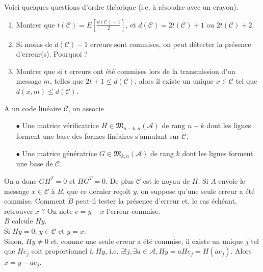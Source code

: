 Voici quelques questions d'ordre théorique (i.e. à résoudre avec un crayon).
\begin{enumerate}
\item Montrer que $t(\mathcal C)=E[\frac{d(\mathcal C)-1}{2}]$, et $d(\mathcal C)=2t(\mathcal C)+1$ ou $2t(\mathcal C)+2$.
\item Si moins de $d(\mathcal C)-1$ erreurs sont commises, on peut détecter la présence d'erreur(s). Pourquoi ?
\item Montrer que si $t$ erreurs ont été commises lors de la transmission d'un message $m$, telles que $2t+1\leq d(\mathcal C)$, alors il existe un unique $x\in \mathcal C$ tel que $d(x,m)\leq d(\mathcal C)$.\\
\end{enumerate}

A un code linéaire $\mathcal C$, on associe
\begin{itemize}
\item[$\bullet$] Une matrice vérificatrice $H\in \mathfrak M_{n-k,n}(\mathcal A)$ de rang $n-k$ dont les lignes forment une base des formes linéaires s'annulant sur $\mathcal C$.
\item[$\bullet$] Une matrice génératrice $G\in \mathfrak M_{k,n}(\mathcal A)$ de rang $k$ dont les lignes forment une base de $\mathcal C$.\\
\end{itemize}

On a donc $GH^T = 0$ et $HG^T=0$. De plus $\mathcal C$ est le noyau de $H$. Si $A$ envoie le message $x\in \mathcal C$ à $B$, que ce dernier reçoit $y$, on suppose qu'une seule erreur a été commise. Comment $B$ peut-il tester la présence d'erreur et, le cas échéant, retrouver $x$ ? On note $e=y-x$ l'erreur commise.\\

$B$ calcule $Hy$. \\
Si $Hy=0$, $y\in \mathcal C$ et $y=x$.\\
Sinon, $Hy\neq 0$ et, comme une seule erreur a été commise, il existe un unique $j$ tel que $He_j$ soit proportionnel à $Hy$, i.e. $\exists ! j, \exists a\in \mathcal A, Hy=aHe_j = H(ae_j)$. Alors $x=y-ae_j$.\\

